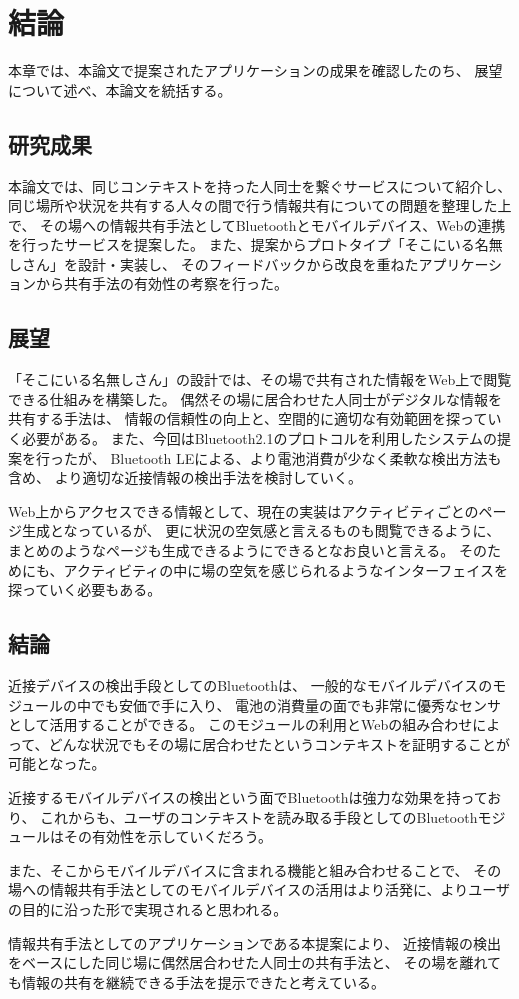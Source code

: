 \chapter{結論}\label{chap:conclusion}

本章では、本論文で提案されたアプリケーションの成果を確認したのち、
展望について述べ、本論文を統括する。

\newpage

\section{研究成果}

本論文では、同じコンテキストを持った人同士を繋ぐサービスについて紹介し、
同じ場所や状況を共有する人々の間で行う情報共有についての問題を整理した上で、
その場への情報共有手法としてBluetoothとモバイルデバイス、Webの連携を行ったサービスを提案した。
また、提案からプロトタイプ「そこにいる名無しさん」を設計・実装し、
そのフィードバックから改良を重ねたアプリケーションから共有手法の有効性の考察を行った。

\section{展望}

「そこにいる名無しさん」の設計では、その場で共有された情報をWeb上で閲覧できる仕組みを構築した。
偶然その場に居合わせた人同士がデジタルな情報を共有する手法は、
情報の信頼性の向上と、空間的に適切な有効範囲を探っていく必要がある。
また、今回はBluetooth2.1のプロトコルを利用したシステムの提案を行ったが、
Bluetooth LEによる、より電池消費が少なく柔軟な検出方法も含め、
より適切な近接情報の検出手法を検討していく。

Web上からアクセスできる情報として、現在の実装はアクティビティごとのページ生成となっているが、
更に状況の空気感と言えるものも閲覧できるように、まとめのようなページも生成できるようにできるとなお良いと言える。
そのためにも、アクティビティの中に場の空気を感じられるようなインターフェイスを探っていく必要もある。


\section{結論}

近接デバイスの検出手段としてのBluetoothは、
一般的なモバイルデバイスのモジュールの中でも安価で手に入り、
電池の消費量の面でも非常に優秀なセンサとして活用することができる。
このモジュールの利用とWebの組み合わせによって、どんな状況でもその場に居合わせたというコンテキストを証明することが可能となった。

近接するモバイルデバイスの検出という面でBluetoothは強力な効果を持っており、
これからも、ユーザのコンテキストを読み取る手段としてのBluetoothモジュールはその有効性を示していくだろう。

また、そこからモバイルデバイスに含まれる機能と組み合わせることで、
その場への情報共有手法としてのモバイルデバイスの活用はより活発に、よりユーザの目的に沿った形で実現されると思われる。

情報共有手法としてのアプリケーションである本提案により、
近接情報の検出をベースにした同じ場に偶然居合わせた人同士の共有手法と、
その場を離れても情報の共有を継続できる手法を提示できたと考えている。
